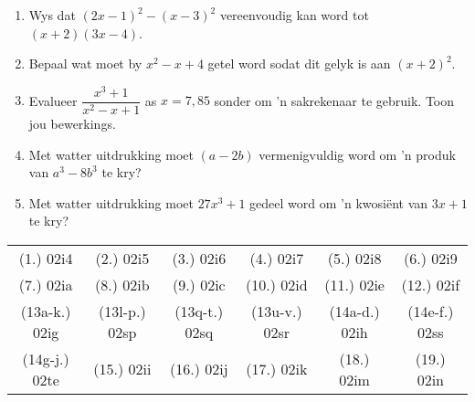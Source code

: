\begin{eocexercises}{}
\begin{enumerate}[itemsep=5pt, label=\textbf{\arabic*}. ]
\item Wys dat ${(2x-1)}^{2}-{(x-3)}^{2}$ vereenvoudig kan word tot  $(x+2)(3x-4)$.

\item Bepaal wat moet by ${x}^{2}-x+4$ getel word sodat dit gelyk is aan ${(x+2)}^{2}$.
\item Evalueer $\dfrac{x^{3}+1}{x^{2}-x+1}$ as $x=7,85$ sonder om 'n sakrekenaar te gebruik. Toon jou bewerkings.
\item Met watter uitdrukking moet $(a-2b)$ vermenigvuldig word om 'n produk van $a^3-8b^3$ te kry?
\item Met watter uitdrukking moet $27x^3+1$ gedeel word om 'n kwosi\"ent van $3x+1$ te kry?
\end{enumerate}


\par \practiceinfo
\par \begin{tabular}[h]{cccccc}
(1.)	02i4	&
(2.)	02i5	&
(3.)	02i6	&
(4.)	02i7	&
(5.)	02i8	&
(6.)	02i9	\\ %
(7.)	02ia	&
(8.)	02ib	&
(9.)	02ic	&
(10.)	02id	&
(11.)	02ie	&
(12.)	02if	\\ %
(13a-k.)	02ig	&
 (13l-p.) 02sp &
(13q-t.) 02sq &
(13u-v.) 02sr &
(14a-d.)	02ih	&
(14e-f.) 02ss	\\ %
(14g-j.) 02te &
(15.)	02ii	&
(16.)	02ij	&
(17.)	02ik	&
(18.)	02im	&
(19.)	02in	\\ %
\end{tabular}

\end{eocexercises}

